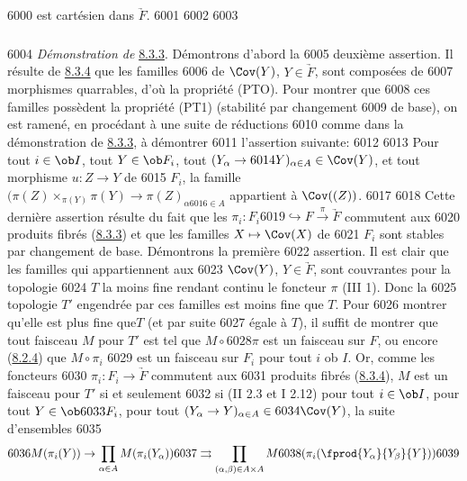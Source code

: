  6000	est cartésien dans $\underrightarrow{F}$.
  6001	
  6002	\setcounter{subsubsection}{4}
  6003	\subsubsection{}
  6004	\emph{Démonstration de} \hyperref[VI.prop8.3.3]{8.3.3}. Démontrons d'abord la
  6005	deuxième assertion. Il résulte de \hyperref[VI.lem8.3.4]{8.3.4} que les familles
  6006	de $\Cov(Y)$, $Y \in \underrightarrow{F}$, sont composées de
  6007	morphismes quarrables, d'où la propriété (PTO). Pour montrer que
  6008	ces familles possèdent la propriété (PT1) (stabilité par changement
  6009	de base), on est ramené, en procédant à une suite de réductions
  6010	comme dans la démonstration de \hyperref[VI.prop8.3.3]{8.3.3}, à démontrer
  6011	l'assertion suivante:
  6012	
  6013	Pour tout $i \in \ob I$, tout $Y \in \ob F_i$, tout $(Y_{\alpha} \to
  6014	Y)_{\alpha \in A} \in \Cov(Y)$, et tout morphisme $u : Z \to Y$ de
  6015	$F_i$, la famille $(\pi(Z) \times_{\pi(Y)} \pi(Y) \to \pi(Z)_{\alpha
  6016	  \in A}$ appartient à $\Cov((Z))$.
  6017	
  6018	Cette dernière assertion résulte du fait que les $\pi_i : F_i
  6019	\hookrightarrow F \xrightarrow{\pi} \underrightarrow{F}$ commutent aux
  6020	produits fibrés (\hyperref[VI.prop8.3.3]{8.3.3}) et que les familles $X \mapsto \Cov(X)$ de
  6021	$F_i$ sont stables par changement de base. Démontrons la première
  6022	assertion. Il est clair que les familles qui appartiennent aux
  6023	$\Cov(Y)$, $Y \in \underrightarrow{F}$, sont couvrantes pour la topologie
  6024	$T$ la moins fine rendant continu le foncteur $\pi$ (III 1). Donc la
  6025	topologie $T'$ engendrée par ces familles est moins fine que $T$. Pour
  6026	montrer qu'elle est plus fine que\pageoriginale $T$ (et par suite
  6027	égale à $T$), il suffit de montrer que tout faisceau $M$ pour $T'$ est tel que $M \circ
  6028	\pi$ est un faisceau sur $F$, ou encore (\hyperref[VI.rem8.2.4]{8.2.4}) que $M \circ \pi_i$
  6029	est un faisceau sur $F_i$ pour tout $i$ ob $I$. Or, comme les foncteurs
  6030	$\pi_i : F_i \to \underrightarrow{F}$ commutent aux
  6031	produits fibrés (\hyperref[VI.lem8.3.4]{8.3.4}), $M$ est un faisceau pour $T'$ si et seulement
  6032	si (II 2.3 et I 2.12) pour tout $i \in \ob I$, pour tout $Y \in \ob
  6033	F_{i}$, pour tout $(Y_{\alpha} \to Y)_{\alpha \in A} \in
  6034	\Cov(Y)$, la suite d'ensembles
  6035	$$
  6036	M(\pi_i (Y)) \to \prod_{\alpha \in A} M (\pi_i (Y_{\alpha}))
  6037	\rightrightarrows \prod_{(\alpha, \beta) \in A \times A} M
  6038	(\pi_i (\fprod{Y_{\alpha}}{Y_{\beta}}{Y}))
  6039	$$

